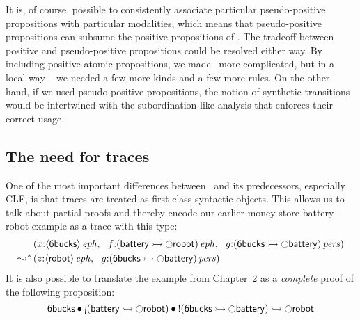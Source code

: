 It is, of course, possible to consistently associate particular
pseudo-positive propositions with particular modalities, which means
that pseudo-positive propositions can subsume the positive
propositions of \sls. The tradeoff between positive and
pseudo-positive propositions could be resolved either way. By
including positive atomic propositions, we made \sls~more complicated,
but in a local way -- we needed a few more kinds and a few more
rules. On the other hand, if we used pseudo-positive propositions, the
notion of synthetic transitions would be intertwined with the
subordination-like analysis that enforces their correct usage.

\subsection{The need for traces}
\label{sec:whytraces}

One of the most important differences between \sls~and its
predecessors, especially CLF, is that traces are treated as
first-class syntactic objects. This allows us to talk about 
partial proofs and thereby encode our earlier 
money-store-battery-robot example as a trace with this type:
\begin{align*}
& \left(
 x{:}{\langle {\sf 6bucks} \rangle}\,{{\it eph}}, ~~
 f{:}{({\sf battery} \rightarrowtail {\ocircle}{\sf robot})}\,{{\it eph}}, ~~
 g{:}{({\sf 6bucks} \rightarrowtail {\ocircle}{\sf battery})}\,{{\it pers}}
\right)
\\
\leadsto^* &
\left(
 z{:}{\langle {\sf robot} \rangle}\,{{\it eph}}, ~~
 g{:}{({\sf 6bucks} \rightarrowtail {\ocircle}{\sf battery})}\,{{\it pers}}
\right)
\end{align*}
It is also possible to translate the example from Chapter~2
as a {\it complete} proof of the following proposition:
\[
  {\sf 6bucks} 
      \fuse {\gnab}({\sf battery} \lefti {\ocircle}{\sf robot})
      \fuse {!}({\sf 6bucks} \lefti {\ocircle}{\sf battery})
     \lefti
     {\ocircle}{\sf robot}
\]

